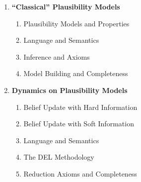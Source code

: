 \documentclass[letterpaper]{article}
\begin{document}
\begin{enumerate}[label=\Alph*]
    \item \textbf{``Classical'' Plausibility Models}
    \begin{enumerate}
        \item Plausibility Models and Properties
        \item Language and Semantics
        \item Inference and Axioms
        \item Model Building and Completeness
    \end{enumerate}
    
    \item \textbf{Dynamics on Plausibility Models}
    \begin{enumerate}
        \item Belief Update with Hard Information
        \item Belief Update with Soft Information
        \item Language and Semantics
        \item The DEL Methodology
        \item Reduction Axioms and Completeness
    \end{enumerate}

\end{enumerate}
\end{document}
